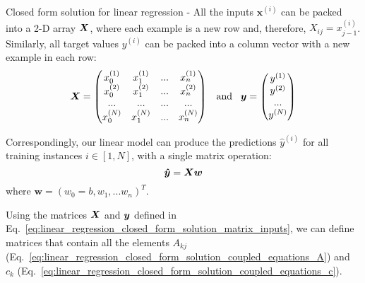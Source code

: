 \begin{frame}[t,allowframebreaks]{Closed form solution for linear regression -}
    All the inputs $\mathbf{x}^{(i)}$ can be packed into a 2-D array $\boldsymbol{X}$,
    where each example is a new row and, therefore, $X_{ij} = x_{j-1}^{(i)}$.
    Similarly, all target values $y^{(i)}$ can be packed into a column vector 
    with a new example in each row:\\
    \vspace{-0.2cm}
    \begin{equation}
        \boldsymbol{X} =
        \begin{pmatrix}
            x_0^{(1)} &  x_1^{(1)} & ... & x_n^{(1)} \\
            x_0^{(2)} &  x_1^{(2)} & ... & x_n^{(2)} \\
            ...       &  ...       & ... & ...       \\
            x_0^{(N)} &  x_1^{(N)} & ... & x_n^{(N)} \\
        \end{pmatrix} 
        \;\;\; \textrm{and} \;\;\;
        \boldsymbol{y} =
        \begin{pmatrix}
            y^{(1)} \\
            y^{(2)} \\
            ...     \\
            y^{(N)} \\
        \end{pmatrix} 
        \label{eq:linear_regression_closed_form_solution_matrix_inputs}
    \end{equation}

    Correspondingly, our linear model can produce the predictions $\hat{y}^{(i)}$ 
    for all training instances $i \in [1,N]$, with a single matrix operation:\\
    \vspace{-0.3cm}
    \begin{equation}
        \boldsymbol{\hat{y}} = \boldsymbol{X}{\boldsymbol{w}}
        \label{eq:linear_regression_closed_form_solution_matrix_output}
    \end{equation}
    \vspace{-0.2cm}
    where $\mathbf{w}=(w_0=b, w_1,...w_{n})^T$.\\

    \framebreak

    Using the matrices $\boldsymbol{X}$ and $\boldsymbol{y}$ defined in 
    Eq.~\ref{eq:linear_regression_closed_form_solution_matrix_inputs},
    we can define matrices that contain all the elements 
    $A_{kj}$ (Eq.~\ref{eq:linear_regression_closed_form_solution_coupled_equations_A}) and
    $c_{k}$ (Eq.~\ref{eq:linear_regression_closed_form_solution_coupled_equations_c}).


\end{frame}
